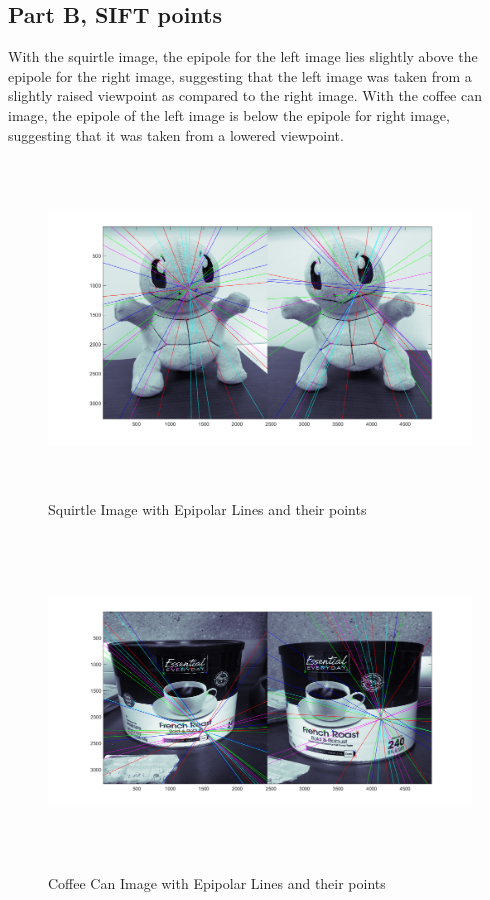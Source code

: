 \documentclass[11pt,psfig]{article}
\begin{document}
\newpage

\subsection*{Part B, SIFT points}

With the squirtle image, the epipole for the left image lies slightly above the epipole for the right image, suggesting that the left image was taken from a slightly raised viewpoint as compared to the right image. With the coffee can image, the epipole of the left image is below the epipole for right image, suggesting that it was taken from a lowered viewpoint. 

\begin{figure}[H]
\centering
\includegraphics[height=3.5in]{squirtle_prob2Epipolar.png}
\caption{Squirtle Image with Epipolar Lines and their points}
\label{p2g}
\end{figure}

\begin{figure}[H]
\centering
\includegraphics[height=3.5in]{coffeeCan_prob2Epipolar.png}
\caption{Coffee Can Image with Epipolar Lines and their points}
\label{p2h}
\end{figure}
\end{document}
